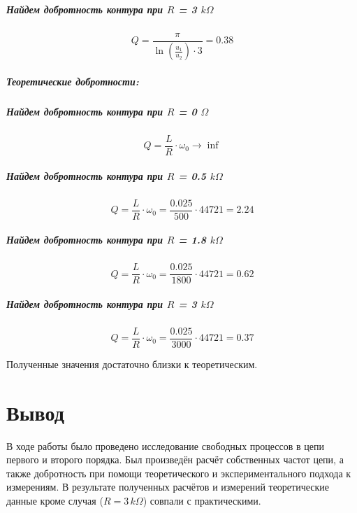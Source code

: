 \documentclass[a4paper,12pt]{report}
\begin{document}
\begin{flushleft}
\subparagraph*{Найдем добротность контура при $R$ = 3 $k\Omega$}
\[ Q = \frac{\pi}{\ln(\frac{u_1}{u_2})\cdot 3} = 0.38 \]

\subparagraph*{Теоретические добротности: }
\subparagraph*{Найдем добротность контура при $R$ = 0 $\Omega$}
\[ Q = \frac{L}{R} \cdot \omega_0 \longrightarrow \inf \]

\subparagraph*{Найдем добротность контура при $R$ = 0.5 $k\Omega$}
\[ Q = \frac{L}{R} \cdot \omega_0 = \frac{0.025}{500}\cdot 44721 = 2.24 \]

\subparagraph*{Найдем добротность контура при $R$ = 1.8 $k\Omega$}
\[ Q = \frac{L}{R} \cdot \omega_0 = \frac{0.025}{1800}\cdot 44721 = 0.62 \]

\subparagraph*{Найдем добротность контура при $R$ = 3 $k\Omega$}
\[ Q = \frac{L}{R} \cdot \omega_0 = \frac{0.025}{3000}\cdot 44721 = 0.37 \]
  
Полученные значения достаточно близки к теоретическим.

\end{flushleft}
\newpage

\section*{Вывод}
В ходе работы было проведено исследование свободных процессов в цепи первого и второго порядка. Был произведён расчёт собственных частот цепи, а также добротность при помощи теоретического и экспериментального подхода к измерениям. В результате полученных расчётов и измерений теоретические данные кроме случая ($R = 3 \, k\Omega$) совпали с практическими.
\end{document}
